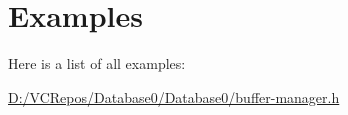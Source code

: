 \section{Examples}
Here is a list of all examples\+:\begin{DoxyCompactItemize}
\item 
\mbox{\hyperlink{_d_1_2_v_c_repos_2_database0_2_database0_2buffer-manager_8h-example}{D\+:/\+V\+C\+Repos/\+Database0/\+Database0/buffer-\/manager.\+h}}
\end{DoxyCompactItemize}
